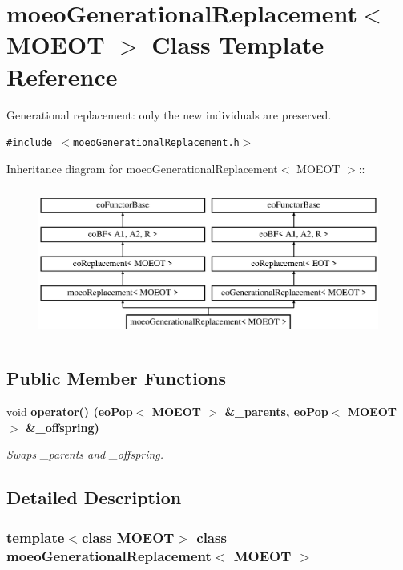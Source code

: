 \section{moeo\-Generational\-Replacement$<$ MOEOT $>$ Class Template Reference}
\label{classmoeoGenerationalReplacement}
Generational replacement: only the new individuals are preserved.  


{\tt \#include $<$moeo\-Generational\-Replacement.h$>$}

Inheritance diagram for moeo\-Generational\-Replacement$<$ MOEOT $>$::\begin{figure}[H]
\begin{center}
\leavevmode
\includegraphics[height=5cm]{classmoeoGenerationalReplacement}
\end{center}
\end{figure}
\subsection*{Public Member Functions}
\begin{CompactItemize}
\item 
void \bf{operator()} (\bf{eo\-Pop}$<$ MOEOT $>$ \&\_\-parents, \bf{eo\-Pop}$<$ MOEOT $>$ \&\_\-offspring)
\begin{CompactList}\small\item\em Swaps \_\-parents and \_\-offspring. \item\end{CompactList}\end{CompactItemize}


\subsection{Detailed Description}
\subsubsection*{template$<$class MOEOT$>$ class moeo\-Generational\-Replacement$<$ MOEOT $>$}


